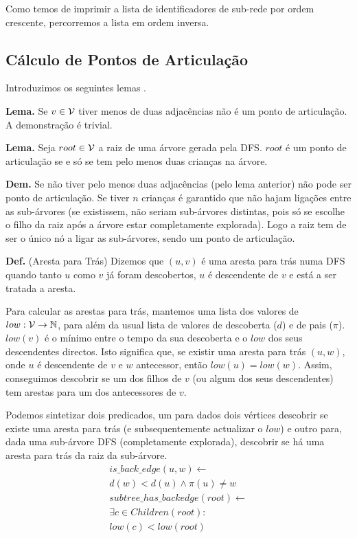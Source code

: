 \documentclass[a4paper, 12pt, conference]{ieeeconf}
\begin{document}
Como temos de imprimir a lista de identificadores de sub-rede por ordem crescente,
percorremos a lista em ordem inversa.

\subsection{Cálculo de Pontos de Articulação}\label{art}
Introduzimos os seguintes lemas .

\textbf{Lema.} Se $v \in {\cal V}$ tiver menos de duas adjacências não é um ponto
de articulação. A demonstração é trivial.

\textbf{Lema.} Seja $root \in {\cal V}$ a raiz de uma árvore gerada pela DFS.
$root$ é um ponto de articulação se e só se tem pelo menos duas crianças na árvore.

\textbf{Dem.} Se não tiver pelo menos duas adjacências (pelo lema anterior) não
pode ser ponto de articulação. Se tiver $n$ crianças é
garantido que não hajam ligações entre as sub-árvores (se existissem, não seriam
sub-árvores distintas, pois só se escolhe o filho da raiz após a árvore estar
completamente explorada). Logo a raiz tem de ser o único nó a ligar as
sub-árvores, sendo um ponto de articulação.

\textbf{Def. } (Aresta para Trás) Dizemos que $(u, v)$ é uma aresta para trás
numa DFS quando tanto $u$ como $v$ já foram descobertos, $u$ é descendente de
$v$ e está a ser tratada a aresta.

Para calcular as arestas para trás, mantemos uma lista dos valores de $low:
{\cal V} \to \mathbb{N}$, para além da usual lista de valores de descoberta
($d$) e de pais ($\pi$).
$low(v)$ é o mínimo entre o tempo da sua descoberta e
o $low$ dos seus descendentes directos. Isto significa que, se existir uma aresta
para trás $(u, w)$, onde $u$ é descendente de $v$ e $w$ antecessor, então
$low(u) = low(w)$. Assim, conseguimos descobrir se um dos filhos de $v$ (ou algum dos seus
descendentes) tem arestas para um dos antecessores de $v$.

Podemos sintetizar dois predicados, um para dados dois vértices descobrir se
existe uma aresta para trás (e subsequentemente actualizar o $low$) e outro
para, dada uma sub-árvore DFS (completamente explorada), descobrir se há uma
aresta para trás da raiz da sub-árvore.
\begin{align*}
  is\_back\_edge(u, w) \leftarrow \\ d(w) < d(u) \land \pi(u) \neq w \\
  subtree\_has\_backedge(root) \leftarrow \\ \exists c \in Children(root) : \\
  low(c) < low(root)
\end{align*}
\end{document}
